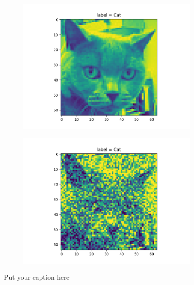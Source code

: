 \documentclass{article}
\begin{document}
\begin{figure}[H]
\begin{subfigure}{.5\textwidth}
  \centering
  \includegraphics[width=1\linewidth]{2a/pic.png}  
  
  \label{fig:sub-first}
\end{subfigure}
\begin{subfigure}{.5\textwidth}
  \centering
  \includegraphics[width=1\linewidth]{2a/Noisy pic.png}  
  
  \label{fig:sub-second}
\end{subfigure}
\caption{Put your caption here}
\label{noise pics}
\end{figure}
\newpage
\end{document}
